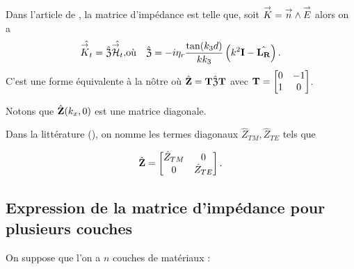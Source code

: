         Dans l'article de \cite{marceaux_high-order_2000}, la matrice d'impédance est telle que, soit \(\vK = \vn \pvect \vE\) alors on a
        \begin{align*}
          \hat{\vK_t} = \hat{\mathfrak{Z}} \hat{\vH_t}, & \text{où} & \hat{\mathfrak{Z}} = -i\eta_r\frac{\tan(k_3d)}{kk_3}\left(k^2\mI - \hat{\mLR}\right).
        \end{align*}
        C'est une forme équivalente à la nôtre où \(\hat{\mZ} = \mT\hat{\mathfrak{Z}}\mT\) avec \(\mT = \begin{bmatrix}0&-1\\1&0\end{bmatrix}\).

        Notons que \(\hat\mZ(k_x,0)\) est une matrice diagonale.
        
        Dans la littérature (\cite{stupfel_implementation_2015,aubakirov_electromagnetic_2014,hoppe_impedance_1995}), on nomme les termes diagonaux \(\hat Z_{TM}, \hat Z_{TE}\) tels que
        
        \begin{equation*}
          \hat \mZ =
          \begin{bmatrix}
            \hat Z_{TM} & 0
            \\
            0 & \hat Z_{TE}
          \end{bmatrix}.
        \end{equation*}

  \subsection{Expression de la matrice d'impédance pour plusieurs couches}
    On suppose que l'on a \(n\) couches de matériaux :
    \begin{figure}[h!btp]
      \centering
      \begin{tikzpicture}
        
      \end{tikzpicture}
    \end{figure}

